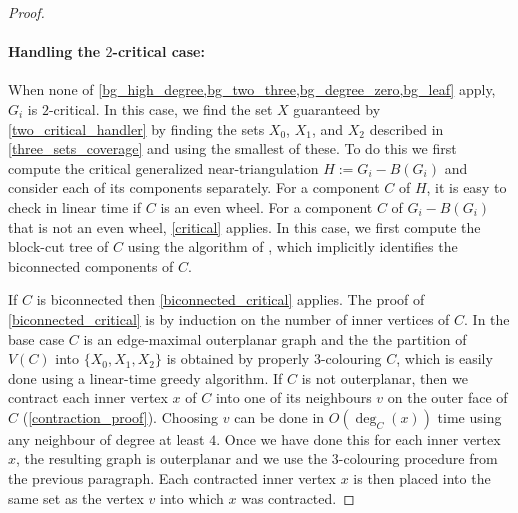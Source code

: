 \documentclass[11pt]{article}
\newcommand{\pat}[1]{\textcolor{red}{PM: #1}}
\newcommand{\hussein}[1]{\textcolor{purple}{HH: #1}}
\theoremstyle{definition}
\begin{document}
\begin{proof}




\paragraph{Handling the $2$-critical case:}
When none of \cref{bg_high_degree,bg_two_three,bg_degree_zero,bg_leaf} apply, $G_i$ is $2$-critical.  In this case, we find the set $X$ guaranteed by \cref{two_critical_handler} by finding the sets $X_0$, $X_1$, and $X_2$ described in \cref{three_sets_coverage} and using the smallest of these.  To do this we first compute the critical generalized near-triangulation $H:=G_i-B(G_i)$ and consider each of its components separately.  For a component $C$ of $H$, it is easy to check in linear time if $C$ is an even wheel.  For a component $C$ of $G_i-B(G_i)$ that is not an even wheel, \cref{critical} applies.  In this case, we first compute the block-cut tree of $C$ using the algorithm of \citet{hopcroft.tarjan:efficient}, which implicitly identifies the biconnected components of $C$.

If $C$ is biconnected then \cref{biconnected_critical} applies.  The proof of \cref{biconnected_critical} is by induction on the number of inner vertices of $C$.  In the base case $C$ is an edge-maximal outerplanar graph and the the partition of $V(C)$ into $\{X_0,X_1,X_2\}$ is obtained by properly $3$-colouring $C$, which is easily done using a linear-time greedy algorithm. If $C$ is not outerplanar, then we contract each inner vertex $x$ of $C$ into one of its neighbours $v$ on the outer face of $C$ (\cref{contraction_proof}).  Choosing $v$ can be done in $O(\deg_C(x))$ time using any neighbour of degree at least $4$. Once we have done this for each inner vertex $x$, the resulting graph is outerplanar and we use the $3$-colouring procedure from the previous paragraph.  Each contracted inner vertex $x$ is then placed into the  same set as the vertex $v$ into which $x$ was contracted.


\end{proof}
\end{document}
